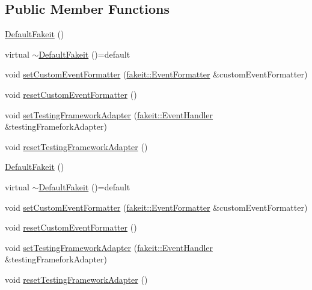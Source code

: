 \subsection*{Public Member Functions}
\begin{DoxyCompactItemize}
\item 
\mbox{\hyperlink{classfakeit_1_1DefaultFakeit_a80d5ef87779c5d3b4e9518ba39e5999f}{Default\+Fakeit}} ()
\item 
virtual \mbox{\hyperlink{classfakeit_1_1DefaultFakeit_a67a996782eb6675b0c0ee0d3b3c9728c}{$\sim$\+Default\+Fakeit}} ()=default
\item 
void \mbox{\hyperlink{classfakeit_1_1DefaultFakeit_acd1e573c131e25862030cec8cf223035}{set\+Custom\+Event\+Formatter}} (\mbox{\hyperlink{structfakeit_1_1EventFormatter}{fakeit\+::\+Event\+Formatter}} \&custom\+Event\+Formatter)
\item 
void \mbox{\hyperlink{classfakeit_1_1DefaultFakeit_a1fe3c5a8670686b732765e6ea1e15b3b}{reset\+Custom\+Event\+Formatter}} ()
\item 
void \mbox{\hyperlink{classfakeit_1_1DefaultFakeit_a7e5375cb58acb0e27a374a32ecf37b5a}{set\+Testing\+Framework\+Adapter}} (\mbox{\hyperlink{structfakeit_1_1EventHandler}{fakeit\+::\+Event\+Handler}} \&testing\+Framefork\+Adapter)
\item 
void \mbox{\hyperlink{classfakeit_1_1DefaultFakeit_a89cf2f8dc0fbfb9e5b18d82eef8fd0c8}{reset\+Testing\+Framework\+Adapter}} ()
\item 
\mbox{\hyperlink{classfakeit_1_1DefaultFakeit_a80d5ef87779c5d3b4e9518ba39e5999f}{Default\+Fakeit}} ()
\item 
virtual \mbox{\hyperlink{classfakeit_1_1DefaultFakeit_a67a996782eb6675b0c0ee0d3b3c9728c}{$\sim$\+Default\+Fakeit}} ()=default
\item 
void \mbox{\hyperlink{classfakeit_1_1DefaultFakeit_acd1e573c131e25862030cec8cf223035}{set\+Custom\+Event\+Formatter}} (\mbox{\hyperlink{structfakeit_1_1EventFormatter}{fakeit\+::\+Event\+Formatter}} \&custom\+Event\+Formatter)
\item 
void \mbox{\hyperlink{classfakeit_1_1DefaultFakeit_a1fe3c5a8670686b732765e6ea1e15b3b}{reset\+Custom\+Event\+Formatter}} ()
\item 
void \mbox{\hyperlink{classfakeit_1_1DefaultFakeit_a7e5375cb58acb0e27a374a32ecf37b5a}{set\+Testing\+Framework\+Adapter}} (\mbox{\hyperlink{structfakeit_1_1EventHandler}{fakeit\+::\+Event\+Handler}} \&testing\+Framefork\+Adapter)
\item 
void \mbox{\hyperlink{classfakeit_1_1DefaultFakeit_a89cf2f8dc0fbfb9e5b18d82eef8fd0c8}{reset\+Testing\+Framework\+Adapter}} ()

\end{DoxyCompactItemize}
